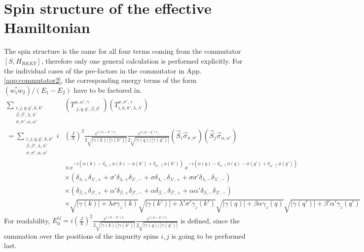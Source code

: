 \newpage
\section{Spin structure of the effective Hamiltonian}\label{app:spinstructure}
The spin structure is the same for all four terms coming from the commutator $[S,H_{RKKY}]$, therefore only one general calculation is performed explicitly.
For the individual cases of the pre-factors in the commutator in App. \ref{app:commutator2}, the corresponding energy terms of the form $(w^*_1  w_2)/(E_1-E_2)$ have to be factored in.
\begin{align} \nonumber
    \sum_{\substack{i, j, q,q', k, k'\\ \beta, \beta', \lambda, \lambda' \\ \sigma, \sigma', \alpha, \alpha'}} &\left( T_{\substack{j,q,q', \beta, \beta'}}^{\alpha, \alpha', \gamma} \right) \left(T^{\sigma, \sigma', \gamma}_{i,k, k', \lambda, \lambda'}\right) \\ \nonumber
   =\sum_{\substack{i, j, q,q', k, k'\\ \beta, \beta', \lambda, \lambda' \\ \sigma, \sigma', \alpha, \alpha'}} i&\left( \frac{J}{N}\right)^2 \frac{e^{i(k-k')r_i}}{2\sqrt{|\gamma(k)|\,|\gamma(k')|}}\frac{e^{i(q-q')r_i}}{2\sqrt{|\gamma(q)|\,|\gamma(q')|}} \left( \Vec{S}_i\Vec{\sigma}_{\sigma,\sigma'} \right)\left( \Vec{S}_j\Vec{\sigma}_{\alpha,\alpha'} \right)\\\nonumber
   &\times e^{-i(\phi(k)-\delta_{\sigma,\uparrow} \phi(k)-\phi(k')+\delta_{\sigma',\uparrow} \phi(k'))}\, e^{-i(\phi(q)-\delta_{\alpha,\uparrow} \phi(q)-\phi(q')+\delta_{\alpha',\uparrow} \phi(q'))} \\ \nonumber
   &\times \left( \delta_{\lambda,+}\delta_{\lambda',+} + \sigma' \delta_{\lambda,+}\delta_{\lambda',-}+ \sigma\delta_{\lambda,-}\delta_{\lambda',+}+\sigma \sigma'\delta_{\lambda,-}\delta_{\lambda',-}\right)\\\nonumber
   &\times \left( \delta_{\beta,+}\delta_{\beta',+} + \alpha' \delta_{\beta,+}\delta_{\beta',-}+ \alpha\delta_{\beta,-}\delta_{\beta',+}+\alpha \alpha'\delta_{\beta,-}\delta_{\beta',-}\right)\\\nonumber
   &\times \sqrt{|\gamma(k)|+ \lambda\sigma \gamma_z(k)}\sqrt{|\gamma(k')|+ \lambda'\sigma' \gamma_z(k')}\sqrt{|\gamma(q)|+\beta\alpha \gamma_z(q)}\sqrt{|\gamma(q')|+ \beta'\alpha' \gamma_z(q')}
\end{align}
For readability, $E^{ij}_0 = i\left(\frac{J}{N}\right)^2 \frac{e^{i(k-k')r_i}}{2\sqrt{|\gamma(k)|\,|\gamma(k')|}}\frac{e^{i(q-q')r_i}}{2\sqrt{|\gamma(q)|\,|\gamma(q')|}}$ is defined, since the summation over the positions of the impurity spins $i,j$ is going to be performed last.\newline

